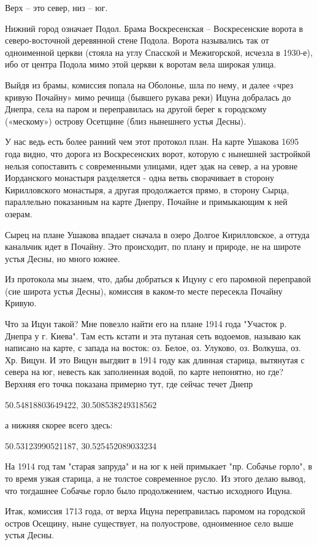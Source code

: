 Верх – это север, низ – юг.

Нижний город означает Подол. Брама Воскресенская – Воскресенские ворота в северо-восточной деревянной стене Подола. Ворота назывались так от одноименной церкви (стояла на углу Спасской и Межигорской, исчезла в 1930-е), ибо от центра Подола мимо этой церкви к воротам вела широкая улица.

Выйдя из брамы, комиссия попала на Оболонье, шла по нему, и далее «чрез кривую Почайну»   мимо речища (бывшего рукава реки) Ицуна добралась до Днепра, села на паром и переправилась на другой берег к городскому («мескому») острову Осетщине (близ нынешнего устья Десны).

У нас ведь есть более ранний чем этот протокол план. На карте Ушакова 1695 года видно, что дорога из Воскресенских ворот, которую с нынешней застройкой нельзя сопоставить с современными улицами, идет эдак на север, а на уровне Иорданского монастыря разделяется - одна ветвь сворачивает в сторону Кирилловского монастыря, а другая продолжается прямо, в сторону Сырца, параллельно показанным на карте Днепру, Почайне и примыкающим к ней озерам.

Сырец на плане Ушакова впадает сначала в озеро Долгое Кирилловское, а оттуда канальчик идет в Почайну. Это происходит, по плану и природе, не на широте устья Десны, но много южнее.

Из протокола мы знаем, что, дабы добраться к Ицуну с его паромной переправой (сие широта устья Десны), комиссия в каком-то месте пересекла Почайну Кривую.

Что за Ицун такой? Мне повезло найти его на плане 1914 года "Участок р. Днепра у г. Киева". Там есть кстати и эта путаная сеть водоемов, называю как написано на карте, с запада на восток: оз. Белое, оз. Улуково, оз. Волкуша, оз. Хр. Вицун. И это Вицун выгдяит в 1914 году как длинная старица, вытянутая с севера на юг,  невесть как заполненная водой, по карте непонятно, но где? Верхняя его точка показана примерно тут, где сейчас течет Днепр

50.54818803649422, 30.508538249318562

а нижняя скорее всего здесь:

50.53123990521187, 30.525452089033234

На 1914 год там "старая запруда" и на юг к ней примыкает "пр. Собачье горло", в то время узкая старица, а не толстое современное русло. Из этого делаю вывод, что тогдашнее Собачье горло было продолжением, частью исходного Ицуна.

Итак, комиссия 1713 года, от верха Ицуна переправилась паромом на городской остров Осещину, ныне существует, на полуострове,  одноименное село выше устья Десны.

